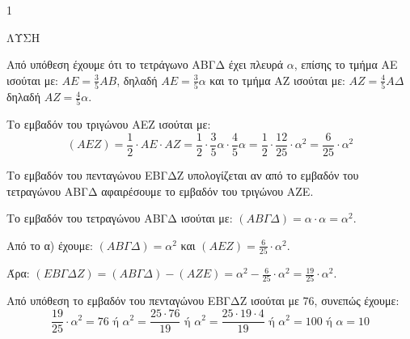 \begin{ylh}{1}
    \item [Ύλη από εικόνα]
\end{ylh}
ΛΥΣΗ

Από υπόθεση έχουμε ότι το τετράγωνο ΑΒΓΔ έχει πλευρά $\alpha$, επίσης το τμήμα ΑΕ ισούται με: $AE = \frac{3}{5} AB$, δηλαδή $AE = \frac{3}{5} \alpha$ και το τμήμα ΑΖ ισούται με: $AZ = \frac{4}{5} A\Delta$ δηλαδή $AZ = \frac{4}{5} \alpha$.

\begin{alist}
\item Το εμβαδόν του τριγώνου ΑΕΖ ισούται με:
\[ (AEZ) = \frac{1}{2} \cdot AE \cdot AZ = \frac{1}{2} \cdot \frac{3}{5} \alpha \cdot \frac{4}{5} \alpha = \frac{1}{2} \cdot \frac{12}{25} \cdot \alpha^2 = \frac{6}{25} \cdot \alpha^2 \]
\item Το εμβαδόν του πενταγώνου ΕΒΓΔΖ υπολογίζεται αν από το εμβαδόν του τετραγώνου ΑΒΓΔ αφαιρέσουμε το εμβαδόν του τριγώνου ΑΖΕ.
\end{alist}

Το εμβαδόν του τετραγώνου ΑΒΓΔ ισούται με: $(AB\Gamma\Delta) = \alpha \cdot \alpha = \alpha^2$.

Από το α) έχουμε: $(AB\Gamma\Delta) = \alpha^2$ και $(AEZ) = \frac{6}{25} \cdot \alpha^2$.

Άρα: $(EB\Gamma\Delta Z) = (AB\Gamma\Delta) - (AZE) = \alpha^2 - \frac{6}{25} \cdot \alpha^2 = \frac{19}{25} \cdot \alpha^2$.

Από υπόθεση το εμβαδόν του πενταγώνου ΕΒΓΔΖ ισούται με 76, συνεπώς έχουμε:
\[ \frac{19}{25} \cdot \alpha^2 = 76 \text{ ή } \alpha^2 = \frac{25 \cdot 76}{19} \text{ ή } \alpha^2 = \frac{25 \cdot 19 \cdot 4}{19} \text{ ή } \alpha^2 = 100 \text{ ή } \alpha = 10 \]